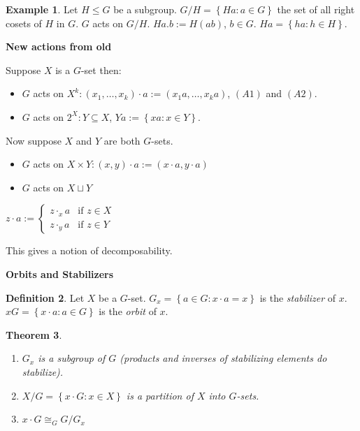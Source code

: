\documentclass[12pt]{amsart}
\newtheorem{theorem}{Theorem}[section]
\theoremstyle{definition}
\newtheorem{example}[theorem]{Example}
\newtheorem{definition}[theorem]{Definition}
\begin{document}
\begin{example}
Let $H \leq G$ be a subgroup.
$G / H = \left\{ Ha : a \in G \right\}$ the set of all right cosets of $H$ in $G$.
$G$ acts on $G / H$. $Ha.b := H(ab)$, $b \in G$. $Ha = \left\{ ha : h \in H \right\}$.
\end{example}

\begin{center}
\textbf{New actions from old}
\end{center}
Suppose $X$ is a $G$-set then:
\begin{itemize}
\item $G$ acts on $X^{k}: \left( x_{1}, \ldots, x_{k} \right) \cdot a := \left(  x_{1} a, \ldots, x_{k} a \right)$, $(A1)$ and $(A2)$.
\item $G$ acts on $2^{X} : Y \subseteq X$, $Ya := \left\{ xa : x \in Y \right\}.$
\end{itemize}

Now suppose $X$ and $Y$ are both $G$-sets.
\begin{itemize}
\item $G$ acts on $X \times Y: \left( x, y \right) \cdot a := \left( x \cdot a, y \cdot a \right) $
\item $G$ acts on $X \sqcup Y$
\end{itemize}

$z \cdot a:=
\begin{cases}
z \cdot_{x} a & \mbox{if } z \in X\\
z \cdot_{y} a & \mbox{if } z \in Y
\end{cases}$

This gives a notion of decomposability.

\begin{center}
\textbf{Orbits and Stabilizers}
\end{center}

\begin{definition}
Let $X$ be a $G$-set. $G_{x} = \left\{ a \in G : x \cdot a = x \right\}$ is the \emph{stabilizer} of $x$.
$xG = \left\{ x\cdot a : a \in G \right\}$ is the \emph{orbit} of $x$.
\end{definition}

\begin{theorem}
\begin{enumerate}
\item $G_{x}$ is a subgroup of $G$ (products and inverses of stabilizing elements do stabilize).
\item $X / G = \left\{ x \cdot G : x \in X \right\}$ is a partition of $X$ into $G$-sets.
\item $x \cdot G \cong_{G} G / G_{x}$
\end{enumerate}
\end{theorem}
\end{document}
